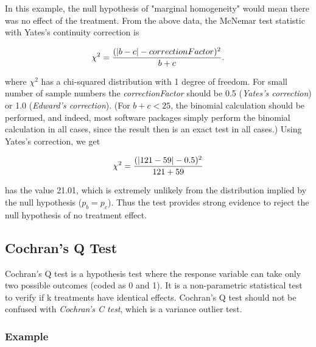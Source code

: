 In this example, the null hypothesis of "marginal homogeneity" would mean there was no effect of the treatment. From the above data, the McNemar test statistic with Yates's continuity correction is

\begin{equation}
    \chi^2 = {(|b-c|-correctionFactor)^2 \over b+c}.
\end{equation}

where $\chi^2$ has a chi-squared distribution with 1 degree of freedom. For small number of sample numbers the \emph{correctionFactor} should be 0.5 (\emph{Yates's correction}) or 1.0 (\emph{Edward's correction}). (For $b + c < 25$, the binomial calculation should be performed, and indeed, most software packages simply perform the binomial calculation in all cases, since the result then is an exact test in all cases.) Using Yates's correction, we get

\begin{equation}
    \chi^2 = {(|121 - 59| - 0.5)^2 \over {121 + 59}}
\end{equation}

has the value 21.01, which is extremely unlikely from the distribution implied by the null hypothesis ($p_b = p_c$). Thus the test provides strong evidence to reject the null hypothesis of no treatment effect.

%

\subsection{Cochran's Q Test}

Cochran's Q test is a hypothesis test where the response variable can take only two possible outcomes (coded as 0 and 1). It is a non-parametric statistical test to verify if k treatments have identical effects. Cochran's Q test should not be confused with \emph{Cochran's C test}, which is a variance outlier test.

\subsubsection{Example}

